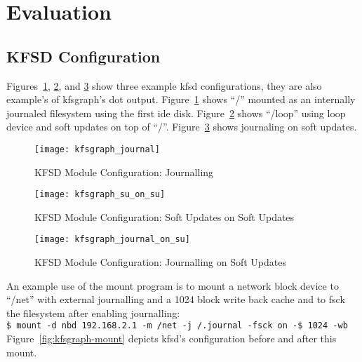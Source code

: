 \section{Evaluation}
\label{sec:eval}

\subsection{KFSD Configuration}
\label{sec:eval:kfsd-config}

\newcommand{\kfsgraphscale}{0.5}

Figures~\ref{fig:kfsgraph-journal}, \ref{fig:kfsgraph-su-on-su}, and
\ref{fig:kfsgraph-journal-on-su} show three example kfsd
configurations, they are also example's of kfsgraph's dot output.
Figure~\ref{fig:kfsgraph-journal} shows ``/'' mounted as an internally
journaled filesystem using the first ide disk.
Figure~\ref{fig:kfsgraph-su-on-su} shows ``/loop'' using loop device
and soft updates on top of ``/''.
Figure~\ref{fig:kfsgraph-journal-on-su} shows journaling on soft
updates.

\begin{figure}[htb]
\begin{center}
  \texttt{[image: kfsgraph\_journal]}
  \caption{KFSD Module Configuration: Journalling}
  \label{fig:kfsgraph-journal}
\end{center}
\end{figure}

\begin{figure}[htb]
\begin{center}
  \texttt{[image: kfsgraph\_su\_on\_su]}
  \caption{KFSD Module Configuration: Soft Updates on Soft Updates}
  \label{fig:kfsgraph-su-on-su}
\end{center}
\end{figure}

\begin{figure}[htb]
\begin{center}
  \texttt{[image: kfsgraph\_journal\_on\_su]}
  \caption{KFSD Module Configuration: Journalling on Soft Updates}
  \label{fig:kfsgraph-journal-on-su}
\end{center}
\end{figure}

An example use of the mount program is to mount a network block device to
``/net'' with external journalling and a 1024 block write back cache and to fsck the filesystem after enabling journalling:\\
\indent \texttt{\$ mount -d nbd 192.168.2.1 -m /net -j /.journal -fsck on -\$ 1024 -wb}\\
Figure~\ref{fig:kfsgraph-mount} depicts kfsd's configuration before and after this mount.

